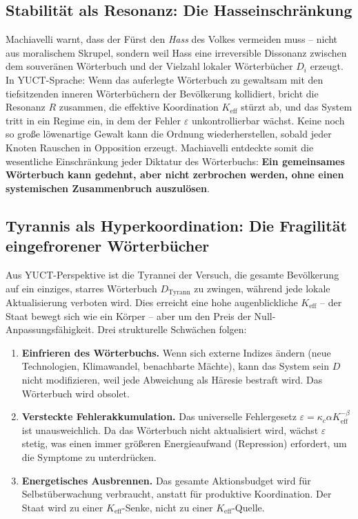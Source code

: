 \documentclass[12pt,a4paper]{article}
\newcommand{\Keff}{K_{\mathrm{eff}}}
\begin{document}
	\subsection{Stabilität als Resonanz: Die Hasseinschränkung}
	
	Machiavelli warnt, dass der Fürst den \emph{Hass} des Volkes vermeiden muss – nicht aus moralischem Skrupel, sondern weil Hass eine irreversible Dissonanz zwischen dem souveränen Wörterbuch und der Vielzahl lokaler Wörterbücher \(D_i\) erzeugt. In YUCT-Sprache: Wenn das auferlegte Wörterbuch zu gewaltsam mit den tiefsitzenden inneren Wörterbüchern der Bevölkerung kollidiert, bricht die Resonanz \(R\) zusammen, die effektive Koordination \(\Keff\) stürzt ab, und das System tritt in ein Regime ein, in dem der Fehler \(\varepsilon\) unkontrollierbar wächst. Keine noch so große löwenartige Gewalt kann die Ordnung wiederherstellen, sobald jeder Knoten Rauschen in Opposition erzeugt. Machiavelli entdeckte somit die wesentliche Einschränkung jeder Diktatur des Wörterbuchs: \textbf{Ein gemeinsames Wörterbuch kann gedehnt, aber nicht zerbrochen werden, ohne einen systemischen Zusammenbruch auszulösen}.
	
	\subsection{Tyrannis als Hyperkoordination: Die Fragilität eingefrorener Wörterbücher}
	
	Aus YUCT-Perspektive ist die Tyrannei der Versuch, die gesamte Bevölkerung auf ein einziges, starres Wörterbuch \(D_{\text{Tyrann}}\) zu zwingen, während jede lokale Aktualisierung verboten wird. Dies erreicht eine hohe augenblickliche \(\Keff\) – der Staat bewegt sich wie ein Körper – aber um den Preis der Null-Anpassungsfähigkeit. Drei strukturelle Schwächen folgen:
	
	\begin{enumerate}[leftmargin=*]
		\item \textbf{Einfrieren des Wörterbuchs.} Wenn sich externe Indizes ändern (neue Technologien, Klimawandel, benachbarte Mächte), kann das System sein \(D\) nicht modifizieren, weil jede Abweichung als Häresie bestraft wird. Das Wörterbuch wird obsolet.
		\item \textbf{Versteckte Fehlerakkumulation.} Das universelle Fehlergesetz \(\varepsilon = \kappa_c \alpha \Keff^{-\beta}\) ist unausweichlich. Da das Wörterbuch nicht aktualisiert wird, wächst \(\varepsilon\) stetig, was einen immer größeren Energieaufwand (Repression) erfordert, um die Symptome zu unterdrücken.
		\item \textbf{Energetisches Ausbrennen.} Das gesamte Aktionsbudget wird für Selbstüberwachung verbraucht, anstatt für produktive Koordination. Der Staat wird zu einer \(\Keff\)-Senke, nicht zu einer \(\Keff\)-Quelle.
	\end{enumerate}
	
\end{document}
